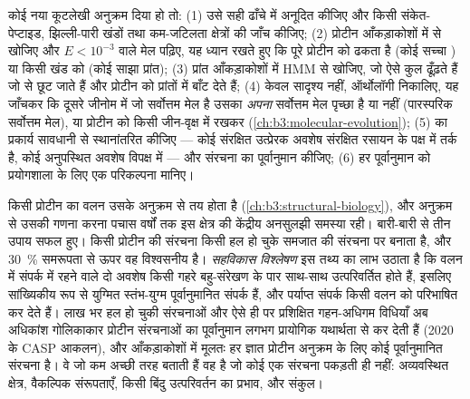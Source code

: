 \begin{method}[किसी अज्ञात प्रोटीन पर टिप्पणी लगाना]\label{met:b3:bioinformatics:annotate}
कोई नया कूटलेखी अनुक्रम दिया हो तो: (1) उसे सही ढाँचे में अनूदित कीजिए
और किसी संकेत-पेप्टाइड, झिल्ली-पारी खंडों तथा कम-जटिलता क्षेत्रों की
जाँच कीजिए; (2) प्रोटीन आँकड़ाकोशों में  से खोजिए और $E < 10^{-3}$
वाले मेल पढ़िए, यह ध्यान रखते हुए कि  पूरे प्रोटीन को ढकता है
(कोई सच्चा ) या किसी खंड को (कोई साझा प्रांत); (3) प्रांत
आँकड़ाकोशों में  HMM से खोजिए, जो ऐसे कुल ढूँढ़ते हैं जो 
से छूट जाते हैं और प्रोटीन को प्रांतों में बाँट देते हैं; (4) केवल
सादृश्य नहीं, ऑर्थोलॉगी निकालिए, यह जाँचकर कि दूसरे जीनोम में जो
सर्वोत्तम मेल है उसका \emph{अपना} सर्वोत्तम मेल पृच्छा है या नहीं
(पारस्परिक सर्वोत्तम मेल), या प्रोटीन को किसी जीन-वृक्ष में रखकर
(\cref{ch:b3:molecular-evolution});
(5)  का प्रकार्य सावधानी से स्थानांतरित कीजिए --- कोई संरक्षित
उत्प्रेरक अवशेष संरक्षित रसायन के पक्ष में तर्क है, कोई अनुपस्थित अवशेष
विपक्ष में --- और संरचना का पूर्वानुमान कीजिए; (6) हर पूर्वानुमान को
प्रयोगशाला के लिए एक परिकल्पना मानिए।
\end{method}

\begin{proposition}[अनुक्रम से संरचना]\label{prop:b3:bioinformatics:structure}
किसी प्रोटीन का वलन उसके अनुक्रम से तय होता है
(\cref{ch:b3:structural-biology}), और अनुक्रम से उसकी गणना करना पचास
वर्षों तक इस क्षेत्र की केंद्रीय अनसुलझी समस्या रही। बारी-बारी से तीन
उपाय सफल हुए। \emph{} किसी प्रोटीन की संरचना किसी हल
हो चुके समजात की संरचना पर बनाता है, और \qty{30}{\%} समरूपता से ऊपर वह
विश्वसनीय है। \emph{सहविकास विश्लेषण} इस तथ्य का लाभ उठाता है कि वलन
में संपर्क में रहने वाले दो अवशेष किसी गहरे बहु-संरेखण के पार साथ-साथ
उत्परिवर्तित होते हैं, इसलिए सांख्यिकीय रूप से युग्मित स्तंभ-युग्म
पूर्वानुमानित संपर्क हैं, और पर्याप्त संपर्क किसी वलन को परिभाषित कर
देते हैं। लाख भर हल हो चुकी संरचनाओं और ऐसे ही  पर प्रशिक्षित
गहन-अधिगम विधियाँ अब अधिकांश गोलिकाकार प्रोटीन संरचनाओं का
पूर्वानुमान लगभग प्रायोगिक यथार्थता से कर देती हैं (2020 के CASP
आकलन), और आँकड़ाकोशों में मूलतः हर ज्ञात प्रोटीन अनुक्रम के लिए कोई
पूर्वानुमानित संरचना है। वे जो कम अच्छी तरह बताती हैं वह है जो कोई एक
संरचना पकड़ती ही नहीं: अव्यवस्थित क्षेत्र, वैकल्पिक संरूपताएँ, किसी
बिंदु उत्परिवर्तन का प्रभाव, और संकुल।
\end{proposition}

